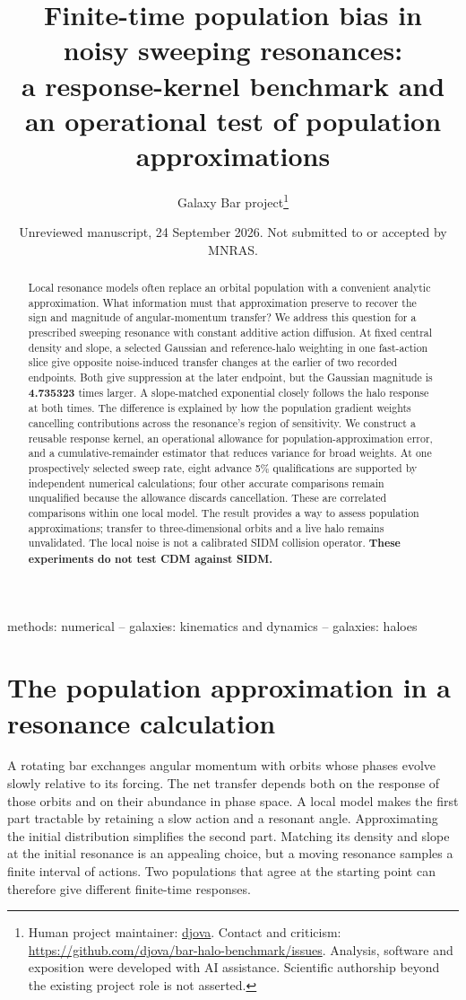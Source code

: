 \documentclass[fleqn,usenatbib]{mnras}
\title[Population bias in noisy resonances]{Finite-time population bias in noisy sweeping resonances:\\
 a response-kernel benchmark and an operational test of population approximations}
\author[Galaxy Bar project]{Galaxy Bar project\thanks{Human project maintainer: \href{https://github.com/djova}{djova}.
Contact and criticism: \url{https://github.com/djova/bar-halo-benchmark/issues}.
Analysis, software and exposition were developed with AI assistance. Scientific authorship beyond the existing project role is not asserted.}}
\date{Unreviewed manuscript, 24 September 2026. Not submitted to or accepted by MNRAS.}
\begin{document}
\label{firstpage}
\pagerange{\pageref{firstpage}--\pageref{LastPage}}
\maketitle

\begin{abstract}
Local resonance models often replace an orbital population with a convenient analytic approximation. What information must that approximation preserve to recover the sign and magnitude of angular-momentum transfer? We address this question for a prescribed sweeping resonance with constant additive action diffusion. At fixed central density and slope, a selected Gaussian and reference-halo weighting in one fast-action slice give opposite noise-induced transfer changes at the earlier of two recorded endpoints. Both give suppression at the later endpoint, but the Gaussian magnitude is \textbf{4.735323} times larger. A slope-matched exponential closely follows the halo response at both times. The difference is explained by how the population gradient weights cancelling contributions across the resonance's region of sensitivity. We construct a reusable response kernel, an operational allowance for population-approximation error, and a cumulative-remainder estimator that reduces variance for broad weights. At one prospectively selected sweep rate, eight advance 5\% qualifications are supported by independent numerical calculations; four other accurate comparisons remain unqualified because the allowance discards cancellation. These are correlated comparisons within one local model. The result provides a way to assess population approximations; transfer to three-dimensional orbits and a live halo remains unvalidated. The local noise is not a calibrated SIDM collision operator. \textbf{These experiments do not test CDM against SIDM.}
\end{abstract}
\begin{keywords}
methods: numerical -- galaxies: kinematics and dynamics -- galaxies: haloes
\end{keywords}
\section{The population approximation in a resonance calculation}\label{previous-work}

A rotating bar exchanges angular momentum with orbits whose phases evolve slowly relative to its forcing. The net transfer depends both on the response of those orbits and on their abundance in phase space. A local model makes the first part tractable by retaining a slow action and a resonant angle. Approximating the initial distribution simplifies the second part. Matching its density and slope at the initial resonance is an appealing choice, but a moving resonance samples a finite interval of actions. Two populations that agree at the starting point can therefore give different finite-time responses.
\end{document}
